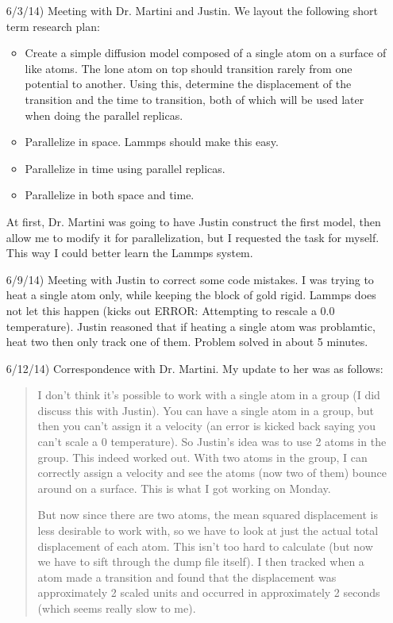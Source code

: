 \documentclass[12pt]{article}
\begin{document}
\begin{itemize}
\item[6/3/14)] Meeting with Dr. Martini and Justin.  We layout the following short term research plan:

\begin{itemize}
 \item Create a simple diffusion model composed of a single atom on a surface of like atoms.  The lone atom on top should transition rarely from one potential to another.  Using this, determine the displacement of the transition and the time to transition, both of which will be used later when doing the parallel replicas.
 \item Parallelize in space.  Lammps should make this easy.
 \item Parallelize in time using parallel replicas.  
 \item Parallelize in both space and time.
\end{itemize}

At first, Dr. Martini was going to have Justin construct the first model, then allow me to modify it for parallelization, but I requested the task for myself.  This way I could better learn the Lammps system.

\item[6/9/14)] Meeting with Justin to correct some code mistakes.  I was trying to heat a single atom only, while keeping the block of gold rigid.  Lammps does not let this happen (kicks out ERROR: Attempting to rescale a 0.0 temperature).  Justin reasoned that if heating a single atom was problamtic, heat two then only track one of them.  Problem solved in about 5 minutes.

\item[6/12/14)] Correspondence with Dr. Martini.  My update to her was as follows:

\begin{quote}
 I don't think it's possible to work with a single atom in a group (I did discuss this with Justin).  You can have a single atom in a group, but then you can't assign it a velocity (an error is kicked back saying you can't scale a 0 temperature).  So Justin's idea was to use 2 atoms in the group.  This indeed worked out.  With two atoms in the group, I can correctly assign a velocity and see the atoms (now two of them) bounce around on a surface.  This is what I got working on Monday.  

But now since there are two atoms, the mean squared displacement is less desirable to work with, so we have to look at just the actual total displacement of each atom.  This isn't too hard to calculate (but now we have to sift through the dump file itself).   I then tracked when a atom made a transition and found that the displacement was approximately 2 scaled units and occurred in approximately 2 seconds (which seems really slow to me).  


\end{quote}
\end{itemize}
\end{document}
